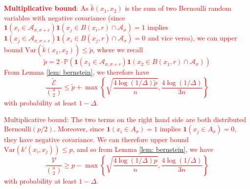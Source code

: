 \documentclass{article}
\newcommand{\1}{\mathbf{1}}
\newcommand{\var}{\mathrm{Var}}
\newcommand{\Aset}{\mathcal{A}}
\newcommand{\Asig}{\Aset_{\sigma}}
\newcommand{\Asigr}{\Aset_{\sigma,\sigma + r}}
\theoremstyle{aldenthm}
\begin{document}
\textcolor{red}{\textbf{Multiplicative bound}: As $\tilde{k}(x_1,x_2)$ is the sum of two Bernoulli random variables with negative covariance (since $\1(x_i \in \Asigr) \1(x_j \in B(x_i,r) \cap \Asig) = 1$ implies $\1(x_j \in \Asigr) \1(x_i \in B(x_j,r) \cap \Asig) = 0$ and vice versa), we can upper bound $\var\left(\tilde{k}(x_1, x_2)\right) \leq  \widetilde{p}$, where we recall 
	\begin{equation*}
	\widetilde{p} = 2\cdot \mathbb{P}\left(\1(x_1 \in \Asigr) \1(x_2 \in B(x_1,r) \cap \Asig)\right)
	\end{equation*}
	From Lemma \ref{lem: bernstein}, we therefore have
	\begin{equation*}
	\frac{\widetilde{\mathcal{E}}}{{n \choose 2}} \leq \widetilde{p} + \max\left\{ \sqrt{\frac{4\log(1/\Delta)\widetilde{p}}{n}}, \frac{4 \log(1/\Delta)}{3n} \right\}
	\end{equation*}
	with probability at least $1 - \Delta$.}

\textcolor{red}{Multiplicative bound: The two terms on the right hand side are both distributed $\mathrm{Bernoulli}(p/2)$. Moreover, since $\1(x_i \in A_\sigma) = 1$ implies $\1(x_j \in A_{\sigma}) = 0$, they have negative covariance. We can therefore upper bound $\var(k'(x_i,x_j)) \leq p$, and so from Lemma \ref{lem: bernstein}, we have
	\begin{equation*}
	\frac{\mathcal{V}}{{n \choose 2}} \geq p - \max\left\{ \sqrt{\frac{4\log(1/\Delta)p}{n}}, \frac{4 \log(1/\Delta)}{3n} \right\}
	\end{equation*}
	with probability at least $1 - \Delta$. }
\end{document}
